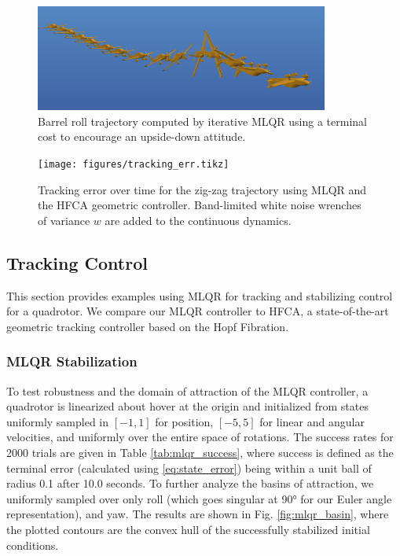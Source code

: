 \documentclass[letterpaper, 10 pt, conference]{ieeeconf}  %
\begin{document}
        \begin{figure}[h]
            \centering
            \includegraphics[height=3.5cm]{figures/barrellroll.png}
            \caption{Barrel roll trajectory computed by iterative MLQR using a terminal cost to encourage an upside-down attitude.}
            \label{fig:barrellroll}
        \end{figure}
    
	    \begin{figure}[h]
	        \centering
	        \texttt{[image: figures/tracking\_err.tikz]}
	        \caption{Tracking error over time for the zig-zag trajectory using MLQR and the HFCA geometric controller. Band-limited white noise wrenches of variance $w$ are added to the continuous dynamics. }
	        \label{fig:tracking_err}
	    \end{figure}
        \vspace{-20pt}

	\subsection{Tracking Control}
	    This section provides examples using MLQR for tracking and stabilizing control
	    for a quadrotor. We compare our MLQR controller to HFCA, a state-of-the-art
	    geometric tracking controller \cite{watterson2020control} based on the Hopf
	    Fibration.
	    
	    \subsubsection{MLQR Stabilization}
	    To test robustness and the domain of attraction of the MLQR controller, a
	    quadrotor is linearized about hover at the origin and initialized from states
	    uniformly sampled in $[-1,1]$ for position, $[-5,5]$ for linear and angular
	    velocities, and uniformly over the entire space of rotations. The success rates
	    for 2000 trials are given in Table \ref{tab:mlqr_success}, where success is
	    defined as the terminal error (calculated using \eqref{eq:state_error}) being
	    within a unit ball of radius 0.1 after 10.0 seconds. To further analyze the
	    basins of attraction, we uniformly sampled over only roll (which goes singular at
	    \ang{90} for our Euler angle representation), and yaw. The results are shown in
	    Fig. \ref{fig:mlqr_basin}, where the plotted contours are the convex hull of the
	    successfully stabilized initial conditions.
	    
\end{document}
